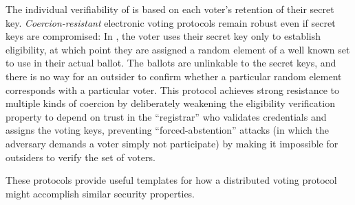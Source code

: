     The individual verifiability of \cite{neff_verifiable_2001} is based on each
    voter's retention of their secret key. \emph{Coercion-resistant} electronic
    voting protocols remain robust even if secret keys are compromised: In
    \cite{juels_coercion-resistant_2005}, the voter uses their secret key only
    to establish eligibility, at which point they are assigned a random element
    of a well known set to use in their actual ballot. The ballots are
    unlinkable to the secret keys, and there is no way for an outsider to
    confirm whether a particular random element corresponds with a particular
    voter. This protocol achieves strong resistance to multiple kinds of
    coercion by deliberately weakening the eligibility verification property to
    depend on trust in the ``registrar'' who validates credentials and assigns the
    voting keys, preventing ``forced-abstention'' attacks (in which the adversary
    demands a voter simply not participate) by making it impossible for
    outsiders to verify the set of voters.

    These protocols provide useful templates for how a distributed voting
    protocol might accomplish similar security properties.

